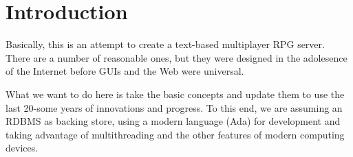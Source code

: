 \chapter{Introduction}
Basically, this is an attempt to create a text-based multiplayer RPG server.
There are a number of reasonable ones, but they were designed in the adolesence of the Internet before GUIs and the Web were universal. 

What we want to do here is take the basic concepts and update them to use the last 20-some years of innovations and progress.
To this end, we are assuming an RDBMS as backing store, using a modern language (Ada) for development and taking advantage of multithreading and the other features of modern computing devices.

